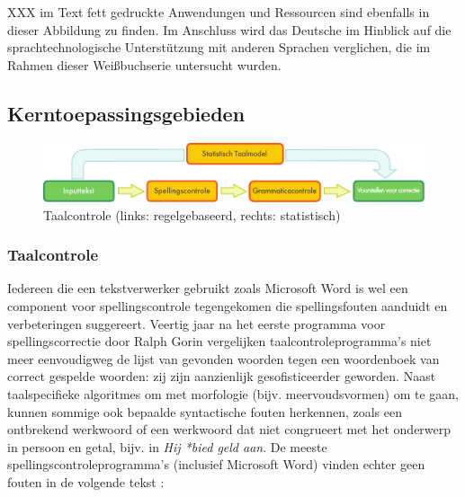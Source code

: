 \documentclass[]{../../metanetpaper}
\begin{document}
\begin{multicols}{2}
XXX
im Text fett gedruckte Anwendungen und Ressourcen sind ebenfalls in dieser Abbildung zu finden. Im Anschluss wird das Deutsche im Hinblick auf die sprachtechnologische Unterstützung mit anderen Sprachen verglichen, die im Rahmen dieser Weißbuchserie untersucht wurden.


\subsection{Kerntoepassingsgebieden} 



\begin{figure}[t]
  \center
  \includegraphics[width=\textwidth]{../_media/dutch/language_checking}
  \caption{Taalcontrole (links: regelgebaseerd, rechts: statistisch)}
  \label{fig:langcheckingaarch_de}
\end{figure}


\subsubsection{Taalcontrole}

    Iedereen die een tekstverwerker gebruikt zoals Microsoft Word is wel een component voor spellingscontrole tegengekomen die spellingsfouten aanduidt en verbeteringen suggereert. Veertig jaar na het eerste programma voor spellingscorrectie door Ralph Gorin vergelijken taalcontroleprogramma's niet meer eenvoudigweg de lijst van gevonden woorden tegen een woordenboek van correct gespelde woorden: zij zijn aanzienlijk gesofisticeerder geworden. Naast taalspecifieke algoritmes om met morfologie (bijv. meervoudsvormen) om te gaan, kunnen sommige ook bepaalde syntactische fouten herkennen, zoals een ontbrekend werkwoord of een werkwoord dat niet congrueert met het onderwerp in persoon en getal, bijv. in \emph{Hij *bied geld aan}. De meeste spellingscontroleprogramma's (inclusief Microsoft Word) vinden echter geen fouten in de volgende tekst \cite{zar1}:



\end{multicols}
\end{document}
